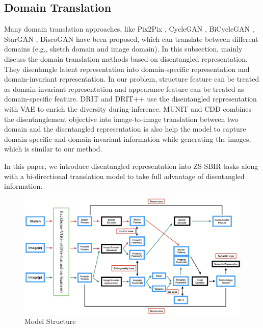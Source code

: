 \documentclass[10pt,twocolumn,letterpaper]{article}
\begin{document}

\subsection{Domain Translation}
Many domain translation approaches, like Pix2Pix \cite{pix2pix2017}, CycleGAN \cite{zhu2017unpaired}, BiCycleGAN \cite{zhu2017toward}, StarGAN \cite{StarGAN2018}, DiscoGAN \cite{kim2017learning} have been proposed, which can translate between different domains (e.g., sketch domain and image domain).
In this subsection, mainly discuss the domain translation methods based on disentangled representation. 
They disentangle latent representation into domain-specific representation and domain-invariant representation. 
In our problem, structure feature can be treated as domain-invariant representation and appearance feature can be treated as domain-specific feature.
DRIT \cite{lee2018diverse} and DRIT++ \cite{lee2019drit} use the disentangled representation with VAE to enrich the diversity during inference. MUNIT \cite{huang2018multimodal} and CDD \cite{gonzalez2018image} combines the disentanglement objective into image-to-image translation between two domain and the disentangled representation is also help the model to capture domain-specific and domain-invariant information while generating the images, which is similar to our method.

In this paper, we introduce disentangled representation into ZS-SBIR tasks along with a bi-directional translation model to take full advantage of disentangled information.


\begin{figure}
\begin{center}
\includegraphics[width=0.95\linewidth]{model_structure.jpg}
\end{center}
   \caption{Model Structure}
\label{fig:structure}
\end{figure}
\end{document}
